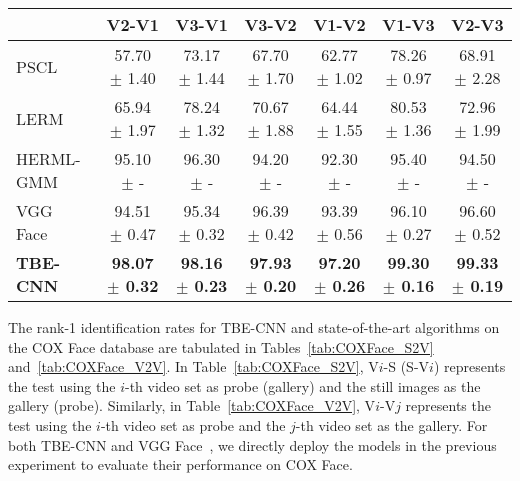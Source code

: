 \documentclass[10pt,journal,cspaper,compsoc]{IEEEtran}
\begin{document}
\begin{table*}[!t]
\renewcommand{\arraystretch}{1.3}
\caption{Rank-1 Identification Rates (\%) under the V2V Setting for Different Methods on the COX Face Database}
\label{tab:COXFace_V2V}
\centering
\begin{tabular}{|l|c|c|c||c|c|c|}
\hline
& V2-V1 & V3-V1 & V3-V2 & V1-V2 & V1-V3 & V2-V3 \\
\hline\hline
PSCL~\cite{Huang2015Benchmark}    &57.70 $\pm$ 1.40   &73.17 $\pm$ 1.44   &67.70 $\pm$ 1.70   &62.77 $\pm$ 1.02   &78.26 $\pm$ 0.97    &68.91 $\pm$ 2.28 \\\hline
LERM~\cite{huang2014learning}     &65.94 $\pm$ 1.97   &78.24 $\pm$ 1.32   &70.67 $\pm$ 1.88   &64.44 $\pm$ 1.55   &80.53 $\pm$ 1.36    &72.96 $\pm$ 1.99 \\\hline
HERML-GMM~\cite{huang2015face}    &95.10 $\pm$ -      &96.30 $\pm$ -      &94.20 $\pm$ -      &92.30 $\pm$ -      &95.40 $\pm$ -       &94.50 $\pm$ - \\\hline
VGG Face~\cite{parkhi2015deep}    &94.51 $\pm$ 0.47   &95.34 $\pm$ 0.32   &96.39 $\pm$ 0.42   &93.39 $\pm$ 0.56   &96.10 $\pm$ 0.27    &96.60 $\pm$ 0.52 \\\hline
\textbf{TBE-CNN}                  &\textbf{98.07 $\pm$ 0.32}   &\textbf{98.16 $\pm$ 0.23}   &\textbf{97.93 $\pm$ 0.20}   &\textbf{97.20 $\pm$ 0.26}   &\textbf{99.30 $\pm$ 0.16}    &\textbf{99.33 $\pm$ 0.19} \\\hline
\end{tabular}
\end{table*}

The rank-1 identification rates for TBE-CNN and state-of-the-art algorithms on the COX Face database are tabulated in Tables~\ref{tab:COXFace_S2V} and~\ref{tab:COXFace_V2V}.
In Table~\ref{tab:COXFace_S2V}, V$i$-S (S-V$i$) represents the test using the $i$-th video set as probe (gallery) and the still images as the gallery (probe).
Similarly, in Table~\ref{tab:COXFace_V2V}, V$i$-V$j$ represents the test using the $i$-th video set as probe and the $j$-th video set as the gallery.
For both TBE-CNN and VGG Face~\cite{parkhi2015deep}, we directly deploy the models in the previous experiment to evaluate their performance on COX Face.
\end{document}
